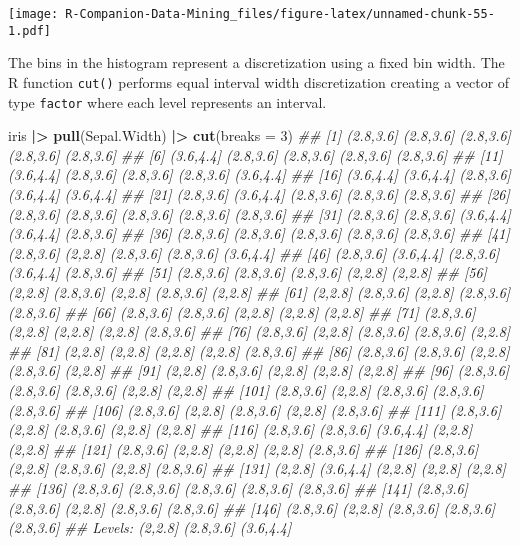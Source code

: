 \documentclass[
  notitlepage]{book}
\newenvironment{Shaded}{\begin{snugshade}}{\end{snugshade}}
\newcommand{\CommentTok}[1]{\textcolor[rgb]{0.56,0.35,0.01}{\textit{#1}}}
\newcommand{\DataTypeTok}[1]{\textcolor[rgb]{0.13,0.29,0.53}{#1}}
\newcommand{\DecValTok}[1]{\textcolor[rgb]{0.00,0.00,0.81}{#1}}
\newcommand{\ErrorTok}[1]{\textcolor[rgb]{0.64,0.00,0.00}{\textbf{#1}}}
\newcommand{\KeywordTok}[1]{\textcolor[rgb]{0.13,0.29,0.53}{\textbf{#1}}}
\newcommand{\NormalTok}[1]{#1}
\newcommand{\OperatorTok}[1]{\textcolor[rgb]{0.81,0.36,0.00}{\textbf{#1}}}
\newcommand{\StringTok}[1]{\textcolor[rgb]{0.31,0.60,0.02}{#1}}
\begin{document}
\texttt{[image: R-Companion-Data-Mining\_files/figure-latex/unnamed-chunk-55-1.pdf]}

The bins in the histogram represent a discretization using a fixed bin
width. The R function \texttt{cut()} performs equal interval width
discretization creating a vector of type \texttt{factor} where each level
represents an interval.

\begin{Shaded}
\begin{Highlighting}[]
\NormalTok{iris }\OperatorTok{|}\ErrorTok{\textgreater{}}\StringTok{ }
\StringTok{  }\KeywordTok{pull}\NormalTok{(Sepal.Width) }\OperatorTok{|}\ErrorTok{\textgreater{}}\StringTok{ }
\StringTok{  }\KeywordTok{cut}\NormalTok{(}\DataTypeTok{breaks =} \DecValTok{3}\NormalTok{)}
\CommentTok{\#\#   [1] (2.8,3.6] (2.8,3.6] (2.8,3.6] (2.8,3.6] (2.8,3.6]}
\CommentTok{\#\#   [6] (3.6,4.4] (2.8,3.6] (2.8,3.6] (2.8,3.6] (2.8,3.6]}
\CommentTok{\#\#  [11] (3.6,4.4] (2.8,3.6] (2.8,3.6] (2.8,3.6] (3.6,4.4]}
\CommentTok{\#\#  [16] (3.6,4.4] (3.6,4.4] (2.8,3.6] (3.6,4.4] (3.6,4.4]}
\CommentTok{\#\#  [21] (2.8,3.6] (3.6,4.4] (2.8,3.6] (2.8,3.6] (2.8,3.6]}
\CommentTok{\#\#  [26] (2.8,3.6] (2.8,3.6] (2.8,3.6] (2.8,3.6] (2.8,3.6]}
\CommentTok{\#\#  [31] (2.8,3.6] (2.8,3.6] (3.6,4.4] (3.6,4.4] (2.8,3.6]}
\CommentTok{\#\#  [36] (2.8,3.6] (2.8,3.6] (2.8,3.6] (2.8,3.6] (2.8,3.6]}
\CommentTok{\#\#  [41] (2.8,3.6] (2,2.8]   (2.8,3.6] (2.8,3.6] (3.6,4.4]}
\CommentTok{\#\#  [46] (2.8,3.6] (3.6,4.4] (2.8,3.6] (3.6,4.4] (2.8,3.6]}
\CommentTok{\#\#  [51] (2.8,3.6] (2.8,3.6] (2.8,3.6] (2,2.8]   (2,2.8]  }
\CommentTok{\#\#  [56] (2,2.8]   (2.8,3.6] (2,2.8]   (2.8,3.6] (2,2.8]  }
\CommentTok{\#\#  [61] (2,2.8]   (2.8,3.6] (2,2.8]   (2.8,3.6] (2.8,3.6]}
\CommentTok{\#\#  [66] (2.8,3.6] (2.8,3.6] (2,2.8]   (2,2.8]   (2,2.8]  }
\CommentTok{\#\#  [71] (2.8,3.6] (2,2.8]   (2,2.8]   (2,2.8]   (2.8,3.6]}
\CommentTok{\#\#  [76] (2.8,3.6] (2,2.8]   (2.8,3.6] (2.8,3.6] (2,2.8]  }
\CommentTok{\#\#  [81] (2,2.8]   (2,2.8]   (2,2.8]   (2,2.8]   (2.8,3.6]}
\CommentTok{\#\#  [86] (2.8,3.6] (2.8,3.6] (2,2.8]   (2.8,3.6] (2,2.8]  }
\CommentTok{\#\#  [91] (2,2.8]   (2.8,3.6] (2,2.8]   (2,2.8]   (2,2.8]  }
\CommentTok{\#\#  [96] (2.8,3.6] (2.8,3.6] (2.8,3.6] (2,2.8]   (2,2.8]  }
\CommentTok{\#\# [101] (2.8,3.6] (2,2.8]   (2.8,3.6] (2.8,3.6] (2.8,3.6]}
\CommentTok{\#\# [106] (2.8,3.6] (2,2.8]   (2.8,3.6] (2,2.8]   (2.8,3.6]}
\CommentTok{\#\# [111] (2.8,3.6] (2,2.8]   (2.8,3.6] (2,2.8]   (2,2.8]  }
\CommentTok{\#\# [116] (2.8,3.6] (2.8,3.6] (3.6,4.4] (2,2.8]   (2,2.8]  }
\CommentTok{\#\# [121] (2.8,3.6] (2,2.8]   (2,2.8]   (2,2.8]   (2.8,3.6]}
\CommentTok{\#\# [126] (2.8,3.6] (2,2.8]   (2.8,3.6] (2,2.8]   (2.8,3.6]}
\CommentTok{\#\# [131] (2,2.8]   (3.6,4.4] (2,2.8]   (2,2.8]   (2,2.8]  }
\CommentTok{\#\# [136] (2.8,3.6] (2.8,3.6] (2.8,3.6] (2.8,3.6] (2.8,3.6]}
\CommentTok{\#\# [141] (2.8,3.6] (2.8,3.6] (2,2.8]   (2.8,3.6] (2.8,3.6]}
\CommentTok{\#\# [146] (2.8,3.6] (2,2.8]   (2.8,3.6] (2.8,3.6] (2.8,3.6]}
\CommentTok{\#\# Levels: (2,2.8] (2.8,3.6] (3.6,4.4]}
\end{Highlighting}
\end{Shaded}
\end{document}
